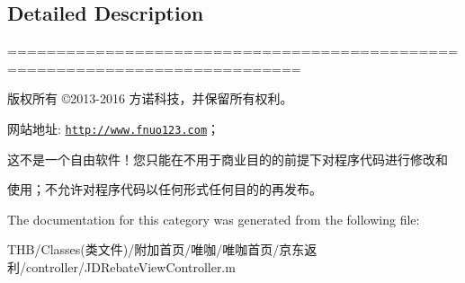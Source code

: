 \subsection{Detailed Description}
============================================================================

版权所有 ©2013-\/2016 方诺科技，并保留所有权利。

网站地址\+: \href{http://www.fnuo123.com}{\tt http\+://www.\+fnuo123.\+com}； 



这不是一个自由软件！您只能在不用于商业目的的前提下对程序代码进行修改和

使用；不允许对程序代码以任何形式任何目的的再发布。 

 

The documentation for this category was generated from the following file\+:\begin{DoxyCompactItemize}
\item 
T\+H\+B/\+Classes(类文件)/附加首页/唯咖/唯咖首页/京东返利/controller/J\+D\+Rebate\+View\+Controller.\+m\end{DoxyCompactItemize}
